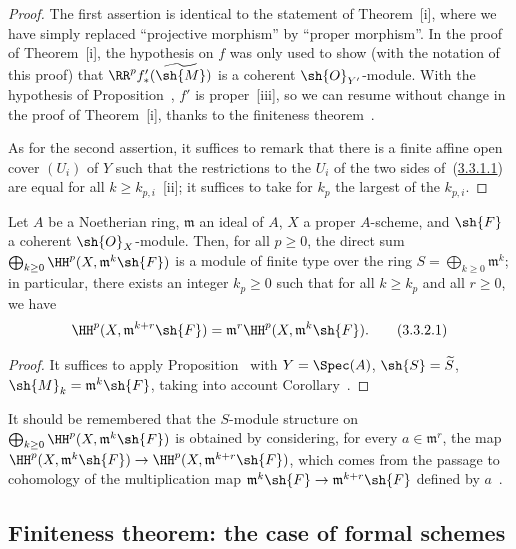\begin{proof}
The first assertion is identical to the statement of Theorem~[i], where we have simply replaced ``projective morphism'' by ``proper morphism''.
In the proof of Theorem~[i], the hypothesis on $f$ was only used to show (with the notation of this proof) that $\RR^p f_*'(\widetilde{\sh{M}})$ is a coherent $\sh{O}_{Y'}$-module.
With the hypothesis of Proposition~, $f'$ is proper~[iii], so we can resume without change in the proof of Theorem~[i], thanks to the finiteness theorem~.

As for the second assertion, it suffices to remark that there is a finite affine open cover $(U_i)$ of $Y$ such that the restrictions to the $U_i$ of the two sides of~(\hyperref[III.3.3.1.1]{3.3.1.1}) are equal for all $k\geq k_{p,i}$~[ii]; it suffices to take for $k_p$ the largest of the $k_{p,i}$.
\end{proof}

\begin{corollary}[3.3.2]
\label{III.3.3.2}
Let $A$ be a Noetherian ring, $\mathfrak{m}$ an ideal of $A$, $X$ a proper $A$-scheme, and $\sh{F}$ a coherent $\sh{O}_X$-module.
Then, for all $p\geq 0$, the direct sum $\bigoplus_{k\geq 0}\HH^p(X,\mathfrak{m}^k\sh{F})$ is a module of finite type over the ring $S=\bigoplus_{k\geq 0}\mathfrak{m}^k$; in particular, there exists an integer $k_p\geq 0$ such that for all $k\geq k_p$ and all $r\geq 0$, we have
\[
\label{III.3.3.2.1}
  \HH^p(X,\mathfrak{m}^{k+r}\sh{F})=\mathfrak{m}^r\HH^p(X,\mathfrak{m}^k\sh{F}).
  \tag{3.3.2.1}
\]
\end{corollary}

\begin{proof}
It suffices to apply Proposition~ with $Y=\Spec(A)$, $\sh{S}=\widetilde{S}$, $\sh{M}_k=\mathfrak{m}^k\sh{F}$, taking into account Corollary~.
\end{proof}

It should be remembered that the $S$-module structure on $\bigoplus_{k\geq 0}\HH^p(X,\mathfrak{m}^k\sh{F})$ is obtained by considering, for every $a\in\mathfrak{m}^r$, the map $\HH^p(X,\mathfrak{m}^k\sh{F})\to\HH^p(X,\mathfrak{m}^{k+r}\sh{F})$, which comes from the passage to cohomology of the multiplication map $\mathfrak{m}^k\sh{F}\to\mathfrak{m}^{k+r}\sh{F}$ defined by $a$~.

\subsection{Finiteness theorem: the case of formal schemes}
\label{subsection:III.3.4}

